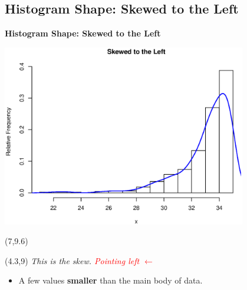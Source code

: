 \documentclass[compress]{beamer}        %
\makeatletter
\newcommand{\tcb}{\textcolor{beamer@blendedblue}}
\newcommand{\tcr}{\textcolor{red}}
\makeatother
\begin{document}
\subsection{Histogram Shape: Skewed to the Left}
\begin{frame}{\bf \tcb{Histogram Shape: Skewed to the Left}\\[-1.1cm]}
\begin{center}
\includegraphics[width=0.8\textwidth, trim = 0.0cm 0.5cm 0.3cm 1.5cm, clip]{SkewLeft}
\end{center}
\begin{textblock}{1}(7,9.6)
\xymatrixrowsep{0.4cm}
\end{textblock}
\begin{textblock}{4}(4.3,9)
{\footnotesize\emph{This is the skew. \tcr{Pointing left {\boldmath$\leftarrow$}}}}
\end{textblock}
\begin{itemize}
\item A few values {\bf smaller} than the main body of data.
\end{itemize}
\end{frame}
\end{document}
